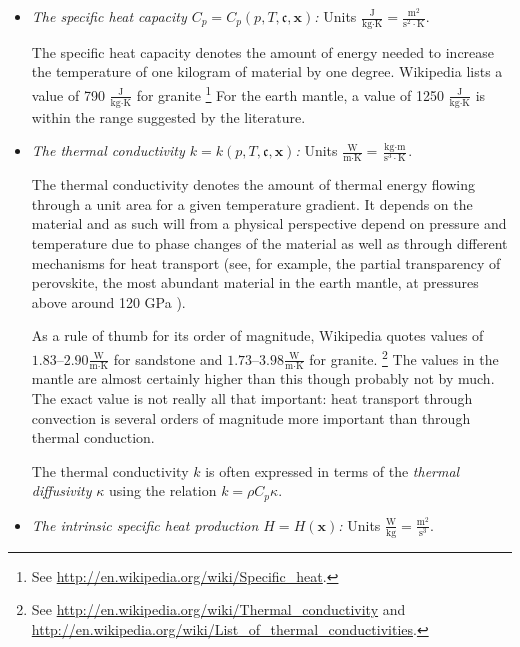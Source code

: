 \documentclass{article}
\begin{document}
\begin{itemize}
\item \textit{The specific heat capacity $C_p=C_p(p,T,\mathfrak c,\mathbf x)$:}
Units $\frac{\textrm{J}}{\textrm{kg}\cdot\textrm{K}} =
  \frac{\textrm{m}^2}{\textrm{s}^2\cdot\textrm{K}}$.

  The specific heat capacity denotes the amount of energy needed to increase
  the temperature of one kilogram of material by one degree. Wikipedia lists a
  value of 790 $\frac{\textrm{J}}{\textrm{kg}\cdot\textrm{K}}$ for granite%
  \footnote{See \url{http://en.wikipedia.org/wiki/Specific_heat}.}
  For the earth mantle, a value of 1250
  $\frac{\textrm{J}}{\textrm{kg}\cdot\textrm{K}}$ is within the range
  suggested by the literature.


\item \textit{The thermal conductivity $k=k(p,T,\mathfrak c,\mathbf x)$:} Units
  $\frac{\textrm{W}}{\textrm{m}\cdot\textrm{K}}=\frac{\textrm{kg}\cdot\textrm{m}}{\textrm{s}^3\cdot\textrm{K}}$.

  The thermal conductivity denotes the amount of thermal energy flowing
  through a unit area for a given temperature gradient. It depends on the
  material and as such will from a physical perspective depend on pressure and
  temperature due to phase changes of the material as well as through
  different mechanisms for heat transport (see, for example, the partial
  transparency of perovskite, the most abundant
  material in the earth mantle, at pressures above around 120 GPa
  \cite{BRVMFG04}).

  As a rule of thumb for its
  order of magnitude, Wikipedia quotes values of
  $1.83$--$2.90\frac{\textrm{W}}{\textrm{m}\cdot\textrm{K}}$ for sandstone and
  $1.73$--$3.98\frac{\textrm{W}}{\textrm{m}\cdot\textrm{K}}$ for granite.%
  \footnote{See \url{http://en.wikipedia.org/wiki/Thermal_conductivity} and
    \url{http://en.wikipedia.org/wiki/List_of_thermal_conductivities}.} The
  values in the mantle are almost certainly higher than this though probably
  not by much. The exact value is not really all that important: heat
  transport through convection is several orders of magnitude more important
  than through thermal conduction.

  The thermal conductivity $k$ is often expressed in terms of the
  \textit{thermal diffusivity} $\kappa$ using the relation $k = \rho C_p \kappa$.

\item \textit{The intrinsic specific heat production $H=H(\mathbf x)$:} Units
  $\frac{\textrm{W}}{\textrm{kg}}=\frac{\textrm{m}^2}{\textrm{s}^3}$.


\end{itemize}
\end{document}
